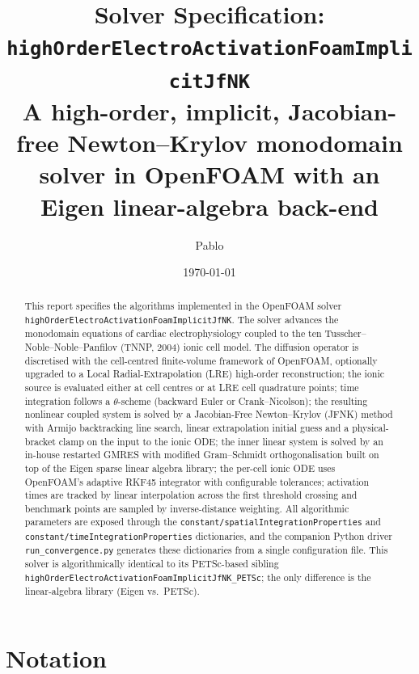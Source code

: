 \documentclass[11pt,a4paper]{article}
\title{Solver Specification:\\
       \texorpdfstring{\texttt{highOrderElectroActivationFoamImplicitJfNK}}{highOrderElectroActivationFoamImplicitJfNK}\\
       \large A high-order, implicit, Jacobian-free Newton--Krylov
       monodomain solver in OpenFOAM with an Eigen linear-algebra back-end}
\author{Pablo}
\date{\today}
\newcommand{\code}[1]{\texttt{\small #1}}
\begin{document}
\maketitle

\begin{abstract}
This report specifies the algorithms implemented in the OpenFOAM solver
\code{highOrderElectroActivationFoamImplicitJfNK}. The solver
advances the monodomain equations of cardiac electrophysiology coupled
to the ten Tusscher--Noble--Noble--Panfilov (TNNP, 2004) ionic cell
model. The diffusion operator is discretised with the cell-centred
finite-volume framework of OpenFOAM, optionally upgraded to a Local
Radial-Extrapolation (LRE) high-order reconstruction; the ionic source
is evaluated either at cell centres or at LRE cell quadrature points;
time integration follows a $\theta$-scheme (backward Euler or
Crank--Nicolson); the resulting nonlinear coupled system is solved by
a Jacobian-Free Newton--Krylov (JFNK) method with Armijo backtracking
line search, linear extrapolation initial guess and a physical-bracket
clamp on the input to the ionic ODE; the inner linear system is solved
by an in-house restarted GMRES with modified Gram--Schmidt
orthogonalisation built on top of the Eigen sparse linear algebra
library; the per-cell ionic ODE uses OpenFOAM's adaptive RKF45
integrator with configurable tolerances; activation times are tracked
by linear interpolation across the first threshold crossing and
benchmark points are sampled by inverse-distance weighting. All
algorithmic parameters are exposed through the
\code{constant/spatialIntegrationProperties} and
\code{constant/timeIntegrationProperties} dictionaries, and the
companion Python driver \code{run\_convergence.py} generates these
dictionaries from a single configuration file. This solver is
algorithmically identical to its PETSc-based sibling
\code{highOrderElectroActivationFoamImplicitJfNK\_PETSc}; the only
difference is the linear-algebra library (Eigen vs.\ PETSc).
\end{abstract}

\tableofcontents
\bigskip

\section{Notation}
\end{document}
